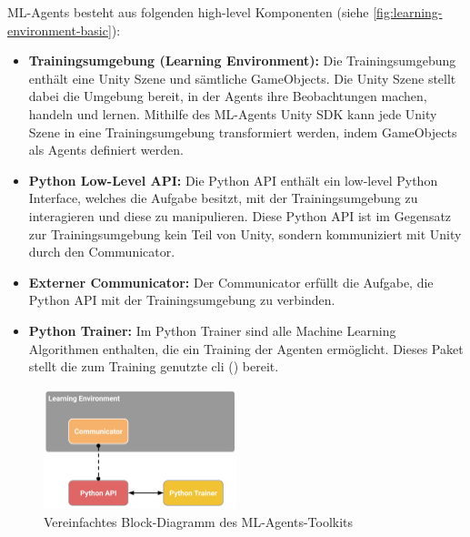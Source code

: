 ML-Agents besteht aus folgenden high-level Komponenten \cite{mlagentsOverview} (siehe \autoref{fig:learning-environment-basic}):
\begin{itemize}
    \item \textbf{Trainingsumgebung (Learning Environment):}
    Die Trainingsumgebung enthält eine Unity Szene und sämtliche GameObjects.
    Die Unity Szene stellt dabei die Umgebung bereit, in der Agents ihre Beobachtungen machen, handeln und lernen.
    Mithilfe des ML-Agents Unity SDK kann jede Unity Szene in eine Trainingsumgebung transformiert werden, indem GameObjects als Agents definiert werden.

    \item \textbf{Python Low-Level API:}
    Die Python API enthält ein low-level Python Interface, welches die Aufgabe besitzt, mit der Trainingsumgebung zu interagieren und diese zu manipulieren.
    Diese Python API ist im Gegensatz zur Trainingsumgebung kein Teil von Unity, sondern kommuniziert mit Unity durch den Communicator.

    \item \textbf{Externer Communicator:}
    Der Communicator erfüllt die Aufgabe, die Python API mit der Trainingsumgebung zu verbinden.

    \item \textbf{Python Trainer:}
    Im Python Trainer sind alle Machine Learning Algorithmen enthalten, die ein Training der Agenten ermöglicht.
    Dieses Paket stellt die zum Training genutzte \ac{cli} () bereit.
\end{itemize}

\begin{figure}
    \centering
    \includegraphics[width = 0.5\textwidth]{Bilder/ml-agents/learning_environment_basic.png}
    \caption{Vereinfachtes Block-Diagramm des ML-Agents-Toolkits \cite{mlagentsOverview}}
    \label{fig:learning-environment-basic}
\end{figure}

